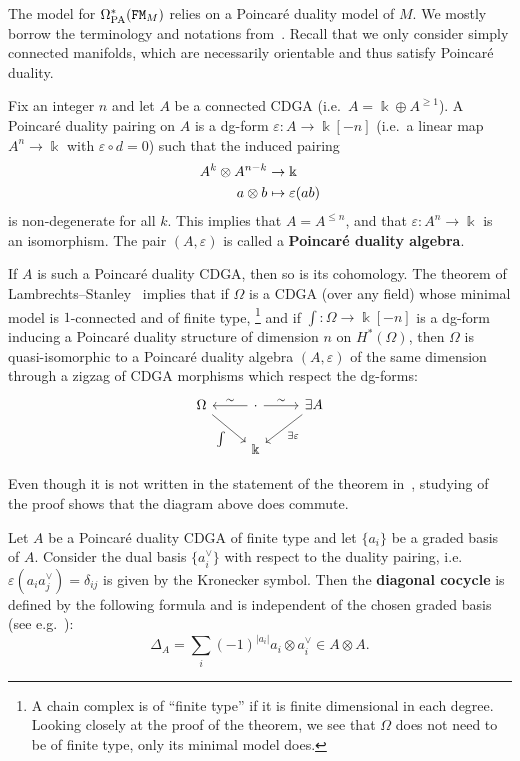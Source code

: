 The model for $\Omega_{\mathrm{PA}}^{*}(\mathtt{FM}_{M})$ relies on a Poincaré duality model of $M$.
We mostly borrow the terminology and notations from~\cite{LambrechtsStanley2008}.
Recall that we only consider simply connected manifolds, which are necessarily orientable and thus satisfy Poincaré duality.

Fix an integer $n$ and let $A$ be a connected CDGA (i.e.\ $A = \Bbbk \oplus A^{\ge 1}$).
A Poincaré duality pairing on $A$ is a dg-form $\varepsilon : A \to \Bbbk[-n]$ (i.e.\ a linear map $A^{n} \to \Bbbk$ with $\varepsilon \circ d = 0$) such that the induced pairing
\begin{align}
  \label{cnf.eq:7}
  A^{k} \otimes A^{n-k}
  & \to \Bbbk
    \notag \\
  a \otimes b
  & \mapsto \varepsilon(ab)
\end{align}
is non-degenerate for all $k$.
This implies that $A = A^{\leq n}$, and that $\varepsilon : A^{n} \to \Bbbk$ is an isomorphism.
The pair $(A,\varepsilon)$ is called a \textbf{Poincaré duality algebra}.

If $A$ is such a Poincaré duality CDGA, then so is its cohomology.
The theorem of Lambrechts--Stanley~\cite{LambrechtsStanley2008} implies that if $\Omega$ is a CDGA (over any field) whose minimal model is $1$-connected and of finite type,%
\footnote{A chain complex is of ``finite type'' if it is finite dimensional in each degree.
  Looking closely at the proof of the theorem, we see that $\Omega$ does not need to be of finite type, only its minimal model does.}
and if $\int : \Omega \to \Bbbk[-n]$ is a dg-form inducing a Poincaré duality structure of dimension $n$ on $H^{*}(\Omega)$, then $\Omega$ is quasi-isomorphic to a Poincaré duality algebra $(A, \varepsilon)$ of the same dimension through a zigzag of CDGA morphisms which respect the dg-forms:
\[ \begin{tikzcd}
    \Omega \drar[swap]{\int} & \cdot \lar[swap]{\sim} \rar{\sim} & \exists A \dlar{\exists \varepsilon} \\
    {} & \Bbbk
  \end{tikzcd} \]

\begin{remark}
  \label{cnf.rmk.commute}
  Even though it is not written in the statement of the theorem in~\cite{LambrechtsStanley2008}, studying of the proof shows that the diagram above does commute.
\end{remark}

Let $A$ be a Poincaré duality CDGA of finite type and let $\{a_{i}\}$ be a graded basis of $A$.
Consider the dual basis $\{ a_{i}^{\vee} \}$ with respect to the duality pairing, i.e.\ $\varepsilon(a_{i} a_{j}^{\vee}) = \delta_{ij}$ is given by the Kronecker symbol.
Then the \textbf{diagonal cocycle} is defined by the following formula and is independent of the chosen graded basis (see e.g.~\cite{FelixOpreaTanre2008}):
\begin{equation}
  \label{cnf.eq.def-delta}
  \Delta_{A} = \sum_{i} (-1)^{|a_{i}|} a_{i} \otimes a_{i}^{\vee} \in A \otimes A.
\end{equation}


